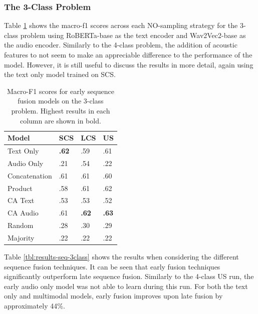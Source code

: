 \documentclass[twocolumn,twoside]{article}
\begin{document}
\subsubsection{The 3-Class Problem}\label{sec:id-3class}

Table \ref{tbl:results-early-3class} shows the macro-f1 scores across
each NO-sampling strategy for the 3-class problem using RoBERTa-base as
the text encoder and Wav2Vec2-base as the audio encoder. Similarly to
the 4-class problem, the addition of acoustic features to not seem to
make an appreciable difference to the performance of the model. However,
it is still useful to discuss the results in more detail, again using
the text only model trained on SCS.

\begin{table}[h]
\centering
\caption{Macro-F1 scores for early sequence fusion models on the 3-class problem. Highest results in each column are shown in bold.\label{tbl:results-early-3class}}
\begin{tabular}{|l|lll|}
\hline
Model         & SCS          & LCS          & US           \\ \hline
Text Only     & \textbf{.62} & .59          & .61          \\
Audio Only    & .21          & .54          & .22          \\ \hline
Concatenation & .61          & .61          & .60          \\
Product       & .58          & .61          & .62          \\
CA Text       & .53          & .53          & .52          \\
CA Audio      & .61          & \textbf{.62} & \textbf{.63} \\ \hline
Random        & .28          & .30          & .29          \\
Majority      & .22          & .22          & .22          \\ \hline
\end{tabular}
\end{table}

Table \ref{tbl:results-seq-3class} shows the results when considering
the different sequence fusion techniques. It can be seen that early
fusion techniques significantly outperform late sequence fusion.
Similarly to the 4-class US run, the early audio only model was not able
to learn during this run. For both the text only and multimodal models,
early fusion improves upon late fusion by approximately 44\%.
\end{document}
